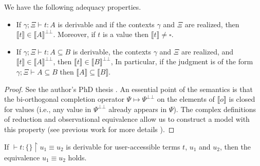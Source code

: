 \begin{theorem}[adequacy]
  We have the following adequacy properties.
  \begin{itemize}
    \item If $\gamma; \Xi \vdash t : A$ is derivable and if the contexts
          $\gamma$ and $\Xi$ are realized, then $\llbracket t \rrbracket
          \in \llbracket A \rrbracket^{\bot\bot}$. Moreover, if $t$ is a
          value then $\llbracket t \rrbracket \not= \square$.
    \item If $\gamma; \Xi \vdash t : A \subseteq B$ is derivable, the contexts
          $\gamma$ and $\Xi$ are realized, and $\llbracket t \rrbracket
          \in \llbracket A \rrbracket^{\bot\bot}$, then $\llbracket t
          \rrbracket \in \llbracket B \rrbracket^{\bot\bot}$, In particular,
          if the judgment is of the form $\gamma; \Xi \vdash A \subseteq B$
          then $\llbracket A \rrbracket \subseteq \llbracket B \rrbracket$.
  \end{itemize}
\end{theorem}
\begin{proof}
  See the author's PhD thesis \cite[Chapter~4]{lepigrePhD}. An essential
  point of the semantics is that the bi-orthogonal completion operator
  $\Psi \mapsto \Psi^{\bot\bot}$ on the elements of $\llbracket o \rrbracket$
  is closed for values (i.e., any value in $\Psi^{\bot\bot}$ already appears
  in $\Psi$). The complex definitions of reduction and observational
  equivalence allow us to construct a model with this property (see previous
  work for more details \cite{lepigre2016,lepigrePhD}).
\end{proof}
\begin{corollary}
  If $\vdash t : \{\} \restriction u_1 \equiv u_2$ is derivable for
  user-accessible terms $t$, $u_1$ and $u_2$, then the equivalence
  $u_1 \equiv u_2$ holds.
\end{corollary}
